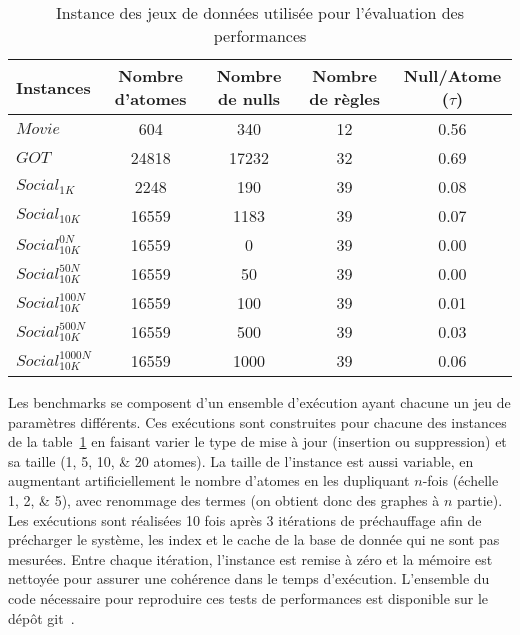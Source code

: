 \begin{table}[ht]
    \centering
    \begin{tabular}{l|c|c|c|c}
        Instances              & Nombre d'atomes & Nombre de nulls & Nombre de règles & Null/Atome ($\tau$) \\
        \hline
        \hline
        $Movie$                & \num{604}       & \num{340}       & \num{12}         & \num{0.56}          \\
        $GOT$                  & \num{24818}     & \num{17232}     & \num{32}         & \num{0.69}          \\
        \hline
        $Social_{1K}$          & \num{2248}      & \num{190}       & \num{39}         & \num{0.08}          \\
        $Social_{10K}$         & \num{16559}     & \num{1183}      & \num{39}         & \num{0.07}          \\
        \hline
        $Social_{10K}^{0N}$    & \num{16559}     & \num{0}         & \num{39}         & \num{0.00}          \\
        $Social_{10K}^{50N}$   & \num{16559}     & \num{50}        & \num{39}         & \num{0.00}          \\
        $Social_{10K}^{100N}$  & \num{16559}     & \num{100}       & \num{39}         & \num{0.01}          \\
        $Social_{10K}^{500N}$  & \num{16559}     & \num{500}       & \num{39}         & \num{0.03}          \\
        $Social_{10K}^{1000N}$ & \num{16559}     & \num{1000}      & \num{39}         & \num{0.06}          \\
    \end{tabular}
    \caption{Instance des jeux de données utilisée pour l'évaluation des performances}
    \label{table:update:xp:datasets}
\end{table}

Les benchmarks se composent d'un ensemble d'exécution ayant chacune un jeu de paramètres différents.
Ces exécutions sont construites pour chacune des instances de la table~\ref{table:update:xp:datasets} en faisant varier le type de mise à jour (insertion ou suppression) et sa taille (\numlist{1;5;10;20} atomes).
La taille de l'instance est aussi variable, en augmentant artificiellement le nombre d'atomes en les dupliquant $n$-fois (échelle \numlist{1;2;5}), avec renommage des termes (on obtient donc des graphes à $n$ partie).
Les exécutions sont réalisées \num{10} fois après \num{3} itérations de préchauffage afin de précharger le système, les index et le cache de la base de donnée qui ne sont pas mesurées.
Entre chaque itération, l'instance est remise à zéro et la mémoire est nettoyée pour assurer une cohérence dans le temps d'exécution.
L'ensemble du code nécessaire pour reproduire ces tests de performances est disponible sur le dépôt \gls{git}~\cite{hiotUpdateChase2023}.

